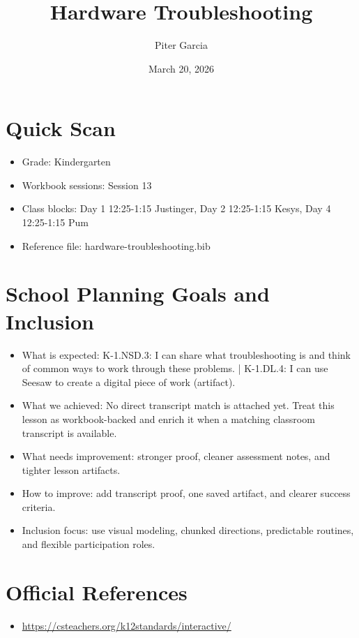 \documentclass[11pt]{article}
\title{Hardware Troubleshooting}
\author{Piter Garcia}
\date{March 20, 2026}
\begin{document}
\maketitle
\section*{Quick Scan}
\begin{itemize}[leftmargin=*]
\item Grade: Kindergarten
\item Workbook sessions: Session 13
\item Class blocks: Day 1 12:25-1:15 Justinger, Day 2 12:25-1:15 Kesys, Day 4 12:25-1:15 Pum
\item Reference file: hardware-troubleshooting.bib
\end{itemize}
\section*{School Planning Goals and Inclusion}
\begin{itemize}[leftmargin=*]
\item What is expected: K-1.NSD.3: I can share what troubleshooting is and think of common ways to work through these problems. | K-1.DL.4: I can use Seesaw to create a digital piece of work (artifact).
\item What we achieved: No direct transcript match is attached yet. Treat this lesson as workbook-backed and enrich it when a matching classroom transcript is available.
\item What needs improvement: stronger proof, cleaner assessment notes, and tighter lesson artifacts.
\item How to improve: add transcript proof, one saved artifact, and clearer success criteria.
\item Inclusion focus: use visual modeling, chunked directions, predictable routines, and flexible participation roles.
\end{itemize}
\section*{Official References}
\begin{itemize}[leftmargin=*]
\item \url{https://csteachers.org/k12standards/interactive/}

\end{itemize}
\end{document}
